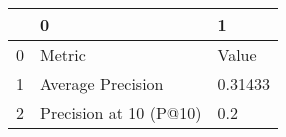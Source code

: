 \begin{tabular}{lll}
\toprule
{} &                       0 &        1 \\
\midrule
0 &                  Metric &    Value \\
1 &       Average Precision &  0.31433 \\
2 &  Precision at 10 (P@10) &      0.2 \\
\bottomrule
\end{tabular}
